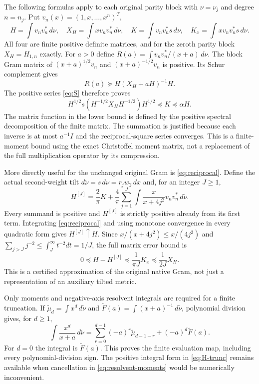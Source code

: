 \documentclass[11pt]{article}
\begin{document}
The following formulas apply to each original parity block with
$\nu=\nu_j$ and degree $n=n_j$. Put $v_n(x)=(1,x,\ldots,x^n)^T$,
\[
 H=\int v_nv_n^*\,d\nu,\quad
 X_H=\int x v_nv_n^*\,d\nu,\quad
 K=\int v_nv_n^*s\,d\nu,\quad
 K_x=\int x v_nv_n^*s\,d\nu.
\]
All four are finite positive definite matrices, and for the
zeroth parity block $X_H=H_{1,n}$ exactly. For $a>0$ define
$R(a)=\int v_nv_n^*/(x+a)\,d\nu$. The block Gram matrix of
$(x+a)^{1/2}v_n$ and $(x+a)^{-1/2}v_n$ is positive. Its Schur
complement gives
\begin{equation}\label{eq:resolvent-compression}
 R(a)\succeq H(X_H+aH)^{-1}H.
\end{equation}
The positive series \eqref{eq:S} therefore proves
\begin{equation}\label{eq:finite-S}
 H^{1/2}s(H^{-1/2}X_HH^{-1/2})H^{1/2}
       \preceq K\preceq\alpha H.
\end{equation}
The matrix function in the lower bound is defined by the positive
spectral decomposition of the finite matrix. The summation is
justified because each inverse is at most $a^{-1}I$ and the
reciprocal-square series converges. This is a finite-moment
bound using the exact Christoffel moment matrix, not a replacement
of the full multiplication operator by its compression.

More directly useful for the unchanged original Gram is
\eqref{eq:reciprocal}. Define the actual second-weight tilt
$d\widetilde\nu=s\,d\nu=r_jw_2\,dx$ and, for an integer $J\geq1$,
\begin{equation}\label{eq:H-trunc}
 H^{[J]}=\frac2\pi K+\frac4\pi\sum_{j=1}^J
       \int\frac{x}{x+4j^2}v_nv_n^*\,d\widetilde\nu.
\end{equation}
Every summand is positive and $H^{[J]}$ is strictly positive
already from its first term. Integrating \eqref{eq:reciprocal}
and using monotone convergence in every quadratic form gives
$H^{[J]}\uparrow H$. Since
$x/(x+4j^2)\leq x/(4j^2)$ and
$\sum_{j>J}j^{-2}\leq\int_J^\infty t^{-2}dt=1/J$, the full
matrix error bound is
\begin{equation}\label{eq:H-error}
 \boxed{0\preceq H-H^{[J]}\preceq\frac1{\pi J}K_x
                                      \preceq\frac1{2J}X_H.}
\end{equation}
This is a certified approximation of the original native Gram,
not just a representation of an auxiliary tilted metric.

Only moments and negative-axis resolvent integrals are required
for a finite truncation. If
$\widetilde\mu_d=\int x^d\,d\widetilde\nu$ and
$\widetilde F(a)=\int(x+a)^{-1}\,d\widetilde\nu$, polynomial
division gives, for $d\geq1$,
\begin{equation}\label{eq:resolvent-moments}
 \int\frac{x^d}{x+a}\,d\widetilde\nu
 =\sum_{r=0}^{d-1}(-a)^r\widetilde\mu_{d-1-r}
                  +(-a)^d\widetilde F(a).
\end{equation}
For $d=0$ the integral is $\widetilde F(a)$. This proves the
finite evaluation map, including every polynomial-division sign.
The positive integral form in \eqref{eq:H-trunc} remains available
when cancellation in \eqref{eq:resolvent-moments} would be
numerically inconvenient.
\end{document}
